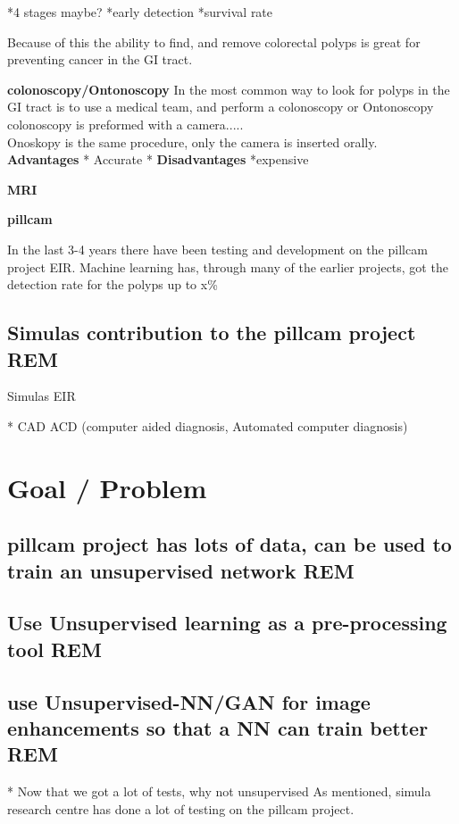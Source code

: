 \documentclass[a4paper,english]{ifimaster}
\begin{document}
	*4 stages maybe?
	*early detection
	*survival rate
	
		
	Because of this the ability to find, and remove colorectal polyps is great for preventing cancer in the GI tract. 
	
	
	\vspace{10px}
	\textbf{colonoscopy/Ontonoscopy}
	In the most common way to look for polyps in the GI tract is to use a medical team, and perform a colonoscopy or Ontonoscopy
	colonoscopy is preformed with a camera.....\\
	Onoskopy is the same procedure, only the camera is inserted orally. \\
	\textbf{Advantages}
	  * Accurate 
	  *
	\vspace{10px}
	\textbf{Disadvantages}
	  *expensive 
	
	\vspace{10px}
	\textbf{MRI}
	
	\vspace{10px}
	\textbf{pillcam}
	
	In the last 3-4 years there have been testing and development on the pillcam project EIR. Machine learning has, through 
	many of the earlier projects, got the detection rate for the polyps up to x\% %
	
	
	\vspace{10px}
	\subsection{Simulas contribution to the pillcam project REM}
	Simulas EIR
		

		
	* CAD ACD (computer aided diagnosis, Automated computer diagnosis)
	
	\section{Goal / Problem}
		\subsection{pillcam project has lots of data, can be used to train an unsupervised network REM}
		\subsection{Use Unsupervised learning as a pre-processing tool REM}
		\subsection{use Unsupervised-NN/GAN for image enhancements so that a NN can train better REM}
		* Now that we got a lot of tests, why not unsupervised
		As mentioned, simula research centre has done a lot of testing on the pillcam project.
		  
\end{document}
